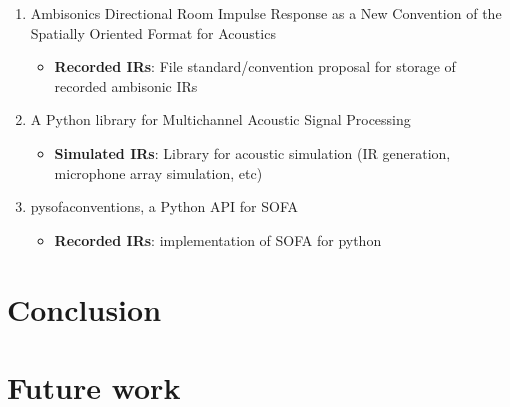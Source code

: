 \begin{itemize}
\begin{enumerate}
  		\item  Ambisonics Directional Room Impulse Response as a New Convention of the Spatially Oriented Format for Acoustics 
		\begin{itemize}
  			\item \textbf{Recorded IRs}: File standard/convention proposal for storage of recorded ambisonic IRs
		\end{itemize}
		
		\item A Python library for Multichannel Acoustic Signal Processing 
		\begin{itemize}
  			\item \textbf{Simulated IRs}: Library for acoustic simulation (IR generation, microphone array simulation, etc)
		\end{itemize}

  		\item pysofaconventions, a Python API for SOFA 
		\begin{itemize}
  			\item \textbf{Recorded IRs}: implementation of SOFA for python 
		\end{itemize}  		
  		
  		
	\end{enumerate}

\end{itemize}


\section{Conclusion}

\section{Future work}

